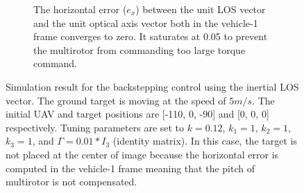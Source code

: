 \begin{figure}
\begin{subfigure}[b]{0.8\linewidth}
		\caption{The horizontal error ($e_x$) between the unit LOS vector and the unit optical axis vector both in the vehicle-1 frame converges to zero. It saturates at 0.05 to prevent the multirotor from commanding too large torque command.}
	\end{subfigure}	
	\caption{Simulation result for the backstepping control using the inertial LOS vector. The ground target is moving at the speed of $5m/s$. The initial UAV and target positions are [-110, 0, -90] and [0, 0, 0] respectively. Tuning parameters are set to $k=0.12$, $k_1=1$, $k_2=1$, $k_3=1$, and $\Gamma=0.01*I_3$ (identity matrix). In this case, the target is not placed at the center of image because the horizontal error is computed in the vehicle-1 frame meaning that the pitch of multirotor is not compensated.}
	\label{inertial_5mps}
\end{figure}


